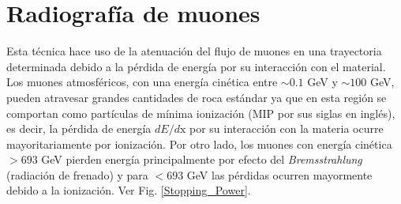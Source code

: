 \section{Radiografía de muones}

Esta técnica hace uso de la atenuación del flujo de muones en una trayectoria determinada debido a la pérdida de energía por su interacción con el material.\\

Los muones atmosféricos, con una energía cinética entre $\sim 0.1$ GeV y $\sim 100$ GeV, pueden atravesar grandes cantidades de roca estándar ya que en esta región se comportan como partículas de mínima ionización (MIP por sus siglas en inglés), es decir, la pérdida de energía $dE/d\text{x}$ por su interacción con la materia ocurre mayoritariamente por ionización. Por otro lado, los muones con energía cinética $> 693$ GeV pierden energía principalmente por efecto del \textit{Bremsstrahlung} (radiación de frenado) y para  $< 693$ GeV las pérdidas ocurren mayormente debido a la ionización. Ver Fig. \ref{Stopping_Power}.


